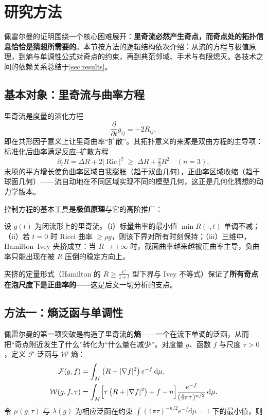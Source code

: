 \section{研究方法}\label{sec:methods}

佩雷尔曼的证明围绕一个核心困难展开：\textbf{里奇流必然产生奇点，而奇点处的拓扑信息恰恰是猜想所需要的}。本节按方法的逻辑结构依次介绍：从流的方程与极值原理，到熵与单调性公式对奇点的约束，再到典范邻域、手术与有限熄灭。各技术之间的依赖关系总结于\cref{sec:results}。

\subsection{基本对象：里奇流与曲率方程}

里奇流是度量的演化方程
\begin{equation}
    \frac{\partial}{\partial t} g_{ij} = -2 R_{ij},
\end{equation}
即在共形因子意义上让里奇曲率“扩散”。其拓扑意义的来源是双曲方程的主导项：标准化后曲率满足反应--扩散方程
\begin{equation}\label{eq:scalar-curvature}
    \partial_t R = \Delta R + 2\bigl|\operatorname{Ric}\bigr|^2 \;\geq\; \Delta R + \tfrac{2}{3} R^2
    \quad (n = 3),
\end{equation}
末项的平方增长使负曲率区域自我膨胀（趋于双曲几何），正曲率区域收缩（趋于球面几何）——流自动地在不同区域实现不同的模型几何，这正是几何化猜想的动力学版本。

控制方程的基本工具是\textbf{极值原理}与它的高阶推广：

\begin{theorem}[曲率的极值原理与夹挤]\label{thm:maxprinciple}
    设 $g(t)$ 为闭流形上的里奇流。（i）标量曲率的最小值 $\min R(\cdot,t)$ 单调不减；（ii）若 $t=0$ 时 Ricci 曲率 $\geq \rho g$，则该下界对所有时刻保持；（iii）三维中，Hamilton--Ivey 夹挤成立：当 $R \to +\infty$ 时，截面曲率越来越被正曲率主导，负曲率只能出现在被 $R$ 压倒的稳定方向上。
\end{theorem}

夹挤的定量形式（Hamilton 的 $R \geq \frac{C}{1+t}$ 型下界与 Ivey 不等式）保证了\textbf{所有奇点在泡尺度下是正曲率的}——这是后文一切分析的支点。

\subsection{方法一：熵泛函与单调性}

佩雷尔曼的第一项突破是构造了里奇流的\textbf{熵}——一个在流下单调的泛函，从而把“奇点附近发生了什么”转化为“什么量在减少”。对度量 $g$、函数 $f$ 与尺度 $\tau > 0$，定义 $\mathcal{F}$-泛函与 $\mathcal{W}$-熵：
\begin{align}
    \mathcal{F}(g, f) &= \int_M \left( R + |\nabla f|^2 \right) e^{-f}\, \mathrm{d}\mu, \notag\\
    \mathcal{W}(g, f, \tau) &= \int_M \Bigl[ \tau\left( R + |\nabla f|^2 \right) + f - n \Bigr] \frac{e^{-f}}{(4\pi\tau)^{n/2}}\, \mathrm{d}\mu .
\end{align}
令 $\mu(g,\tau)$ 与 $\lambda(g)$ 为相应泛函在约束 $\int (4\pi\tau)^{-n/2} e^{-f} \mathrm{d}\mu = 1$ 下的最小值，则

